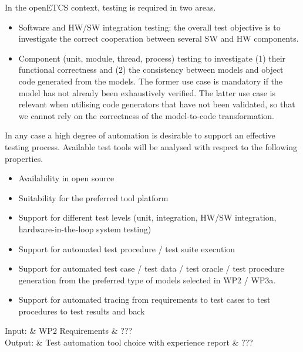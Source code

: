 \documentclass{template/openetcs_article}
\begin{document}
In the openETCS context, testing is required in two areas.
\begin{itemize}
\item Software and HW/SW integration testing: the overall test objective is to
investigate the correct cooperation between several SW and HW components.
\item Component (unit, module,  thread, process) testing to investigate (1) their functional
correctness 
and (2) the consistency between models and
 object code generated from the models. The former use case is mandatory if the model has not already been exhaustively verified. The latter use case is relevant when utilising code generators 
 that have not been validated, so that we cannot rely on the correctness of the model-to-code transformation.
\end{itemize}
In any case a high degree of automation is desirable to support an effective testing process.
Available test tools will be analysed with respect to the following properties.
\begin{itemize}
\item Availability in open source
\item Suitability for the preferred tool platform 
\item Support for different test levels (unit, integration, HW/SW integration, hardware-in-the-loop system testing)
\item Support for automated test procedure / test suite execution
\item Support for automated test case / test data / test oracle / test procedure generation from
the preferred type of models selected in WP2 / WP3a. 
\item Support for automated tracing from requirements to test cases to test procedures to test results and back
\end{itemize}



\begin{inoutput}
Input: & WP2 Requirements & ??? \\
\hline
Output: & Test automation tool choice with experience report & ??? \\
\end{inoutput}
\end{document}
